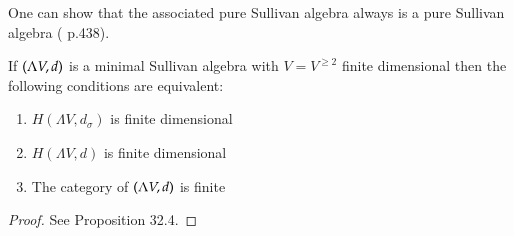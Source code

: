 One can show that the associated pure Sullivan algebra always is a pure Sullivan algebra ( \cite{Felix2001} p.438).

\begin{Proposition}
\label{prop:EquivalenceFiniteDimensionCategoryCohomology}
 If $(\Lambda V,d)$ is a minimal Sullivan algebra with $V = V^{\geq 2}$ finite dimensional then the following conditions
 are equivalent:
 
 \begin{enumerate}
  \item $H(\Lambda V, d_{\sigma})$ is finite dimensional
  \item $H(\Lambda V, d)$ is finite dimensional
  \item The category of $(\Lambda V,d)$ is finite
 \end{enumerate}

\end{Proposition}

\begin{proof}
 See \cite{Felix2001} Proposition 32.4.
\end{proof}
